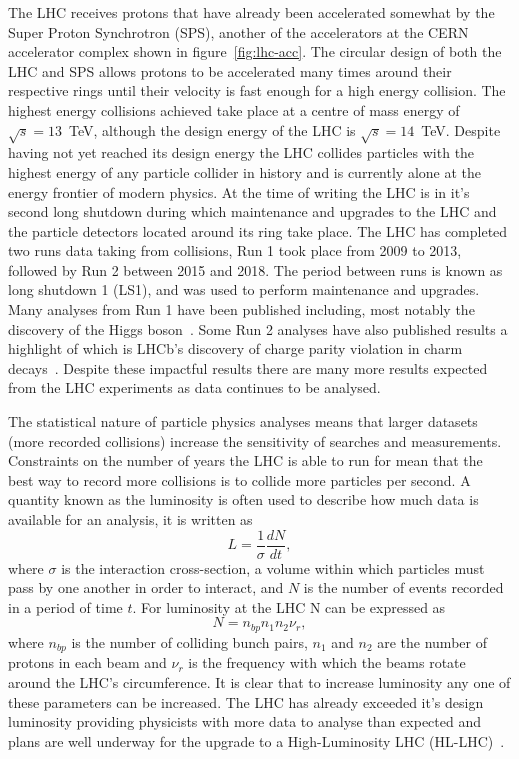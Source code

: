 The LHC receives protons that have already been accelerated somewhat by the
Super Proton Synchrotron (SPS), another of the accelerators at the CERN
accelerator complex shown in figure~\ref{fig:lhc-acc}. The circular design of
both the LHC and SPS allows protons to be accelerated many times around their
respective rings until their velocity is fast enough for a high energy
collision. The highest energy collisions achieved take place at a centre of mass
energy of $\sqrt{s} = 13 $~TeV, although the design energy of the LHC is
$\sqrt{s} = 14 $~TeV. Despite having not yet reached its design energy the LHC
collides particles with the highest energy of any particle collider in history
and is currently alone at the energy frontier of modern physics. At the time of
writing the LHC is in it's second long shutdown during which maintenance and
upgrades to the LHC and the particle detectors located around its ring take
place. The LHC has completed two runs data taking from collisions, Run 1 took
place from 2009 to 2013, followed  by Run 2
between 2015 and 2018. The period between runs is known as long shutdown 1 (LS1), and
was used to perform maintenance and upgrades. Many analyses from Run 1 have been
published including, most notably the discovery of the Higgs
boson~\cite{DiscoHiggsATLAS, DiscoHiggsCMS}. Some Run 2 analyses have also
published results a highlight of which is LHCb's discovery of charge parity
violation in charm decays~\cite{cp-charm}. Despite these impactful results there
are many more results expected from the LHC experiments as data continues to be
analysed.

The statistical nature of particle physics analyses means that larger datasets
(more recorded collisions) increase the sensitivity of searches and
measurements. Constraints on the number of years the LHC is able to run for mean
that the best way to record more collisions is to collide more particles per
second. A quantity known as the luminosity is often used to describe how much
data is available for an analysis, it is written as
\begin{equation}
  \label{eq:luminosity}
  L = \frac{1}{\sigma}\frac{dN}{dt},
\end{equation}
where $\sigma$ is the interaction cross-section, a volume within which particles
must pass by one another in order to interact, and $N$ is the number of events
recorded in a period of time $t$. For luminosity at the LHC N can be expressed as
\begin{equation}
  \label{eq:lhc-lumi}
  N = n_{bp}n_{1}n_{2}\nu_{r},
\end{equation}
where $n_{bp}$ is the number of colliding bunch pairs, $n_{1}$ and $n_{2}$ are
the number of protons in each beam and $\nu_r$ is the frequency with which the
beams rotate around the LHC's circumference. It is clear that to increase
luminosity any one of these parameters can be increased. The LHC has already
exceeded it's design luminosity providing physicists with more data to analyse
than expected and plans are well underway for the upgrade to a High-Luminosity
LHC (HL-LHC)~\cite{hilumi-tdr}.

